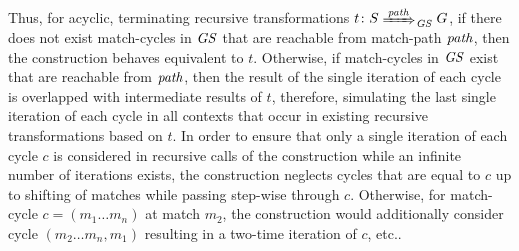 \begin{remark}
\begin{enumerate}
\end{enumerate}
Thus, for acyclic, terminating recursive transformations $t\colon S \Trans{\paths}_\GS G$, if there does not exist match-cycles in $\mathit{GS}$ that are reachable from match-path $\mathit{path}$, then the construction behaves equivalent to $t$.
Otherwise, if match-cycles in $\mathit{GS}$ exist that are reachable from $\mathit{path}$, then the result of the single iteration of each cycle is overlapped with intermediate results of $t$, therefore, simulating the last single iteration of each cycle in all contexts that occur in existing recursive transformations based on $t$.
In order to ensure that only a single iteration of each cycle $c$ is considered in recursive calls of the construction while an infinite number of iterations exists, the construction neglects cycles that are equal to $c$ up to shifting of matches while passing step-wise through $c$.
Otherwise, for match-cycle $c=(m_1\ldots m_n)$ at match $m_2$, the construction would additionally consider cycle $(m_2\ldots m_n,m_1)$ resulting in a two-time iteration of $c$, etc..
\envEndMarker
\end{remark}

